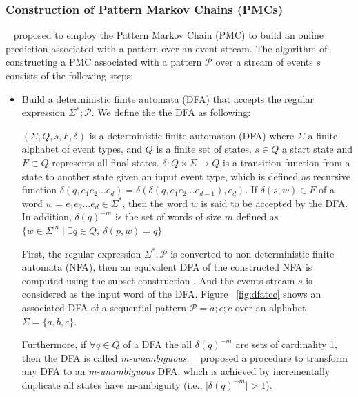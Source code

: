 
\subsubsection*{Construction of Pattern Markov Chains (PMCs)}

~\citet{alevizos2017event} proposed to employ the Pattern Markov Chain (PMC) \cite{nuel_pattern_2008}to build an online prediction associated with a pattern over an event stream. The algorithm of constructing a PMC associated with a pattern $\mathcal{P}$ over a stream of events $s$ consists of the following steps:

\begin{itemize}[noitemsep]
	\item Build a deterministic finite automata (DFA) that accepts the regular expression $\Sigma^{*};\mathcal{P}$. We define the the DFA as following:
	
	\begin{definition}
	 $(\Sigma,Q,s,F,\delta)$ is a deterministic finite automaton (DFA)  where  $\Sigma$ a finite alphabet of event types, and $Q$ is a finite set of states, $s \in Q$ a start state and $F \subset Q$ represents all final states. $\delta: Q \times \Sigma \rightarrow Q$ is a transition function from a state to another state given an input event type, which is defined as recursive function $\delta(q,e_{1}e_{2}\ldots e_{d})=\delta(\delta(q,e_{1}e_{2}...e_{d-1}),e_{d})$. If $\delta(s,w) \in F$ of a word $w=e_{1}e_{2}\ldots e_{d} \in \Sigma^{*}$, then the word $w$ is said to be accepted by the DFA. In addition,  $\delta(q)^{-m}$ is the set of words of size $m$ defined as $\{w \in \Sigma^{m} \mid \exists q \in Q,\ \delta(p,w)=q \}$
\end{definition}
	
	First, the regular expression $\Sigma^{*};\mathcal{P}$ is converted to non-deterministic finite automata (NFA), then an equivalent DFA of the constructed NFA is computed using the subset construction \cite{hopcroft2006automata,alevizos2017event}. And the events stream $s$ is considered as the input word of the DFA. 
 Figure ~\ref{fig:dfatcc} shows an associated DFA of a sequential pattern $\mathcal{P}=a ; c ; c$ over an alphabet $\Sigma=\{a,b,c\}$.

Furthermore, if $\forall q \in Q$ of a DFA the all $\delta(q)^{-m}$ are sets of cardinality 1, then the DFA is called \textit{m-unambiguous}. ~\citet{nuel_pattern_2008} proposed a procedure to transform any DFA to an \textit{m-unambiguous} DFA, which is achieved by incrementally duplicate all states have m-ambiguity (i.e., $\vert\delta(q)^{-m}\vert > 1$).   


\end{itemize}
